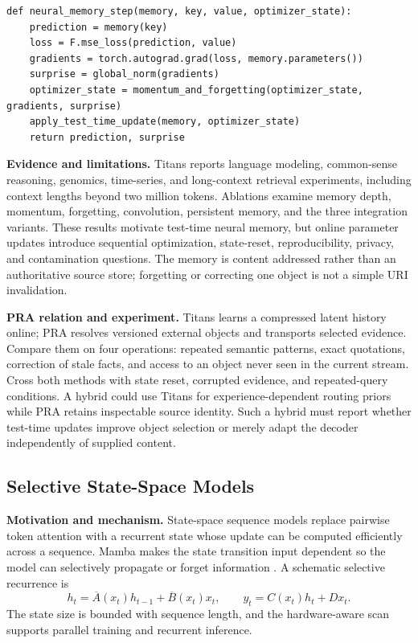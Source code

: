 \begin{lstlisting}[caption={Conceptual surprise-weighted test-time memory update}]
def neural_memory_step(memory, key, value, optimizer_state):
    prediction = memory(key)
    loss = F.mse_loss(prediction, value)
    gradients = torch.autograd.grad(loss, memory.parameters())
    surprise = global_norm(gradients)
    optimizer_state = momentum_and_forgetting(optimizer_state, gradients, surprise)
    apply_test_time_update(memory, optimizer_state)
    return prediction, surprise
\end{lstlisting}

\textbf{Evidence and limitations.} Titans reports language modeling, common-sense
reasoning, genomics, time-series, and long-context retrieval experiments, including context
lengths beyond two million tokens. Ablations examine memory depth, momentum, forgetting,
convolution, persistent memory, and the three integration variants. These results motivate
test-time neural memory, but online parameter updates introduce sequential optimization,
state-reset, reproducibility, privacy, and contamination questions. The memory is content
addressed rather than an authoritative source store; forgetting or correcting one object
is not a simple URI invalidation.

\textbf{PRA relation and experiment.} Titans learns a compressed latent history online;
PRA resolves versioned external objects and transports selected evidence. Compare them on
four operations: repeated semantic patterns, exact quotations, correction of stale facts,
and access to an object never seen in the current stream. Cross both methods with state
reset, corrupted evidence, and repeated-query conditions. A hybrid could use Titans for
experience-dependent routing priors while PRA retains inspectable source identity. Such a
hybrid must report whether test-time updates improve object selection or merely adapt the
decoder independently of supplied content.

\subsection{Selective State-Space Models}

\textbf{Motivation and mechanism.} State-space sequence models replace pairwise token
attention with a recurrent state whose update can be computed efficiently across a sequence.
Mamba makes the state transition input dependent so the model can selectively propagate or
forget information \citep{gu2023mamba}. A schematic selective recurrence is
\begin{equation}
h_t=\overline A(x_t)h_{t-1}+\overline B(x_t)x_t,
\qquad y_t=C(x_t)h_t+D x_t.
\end{equation}
The state size is bounded with sequence length, and the hardware-aware scan supports parallel
training and recurrent inference.

